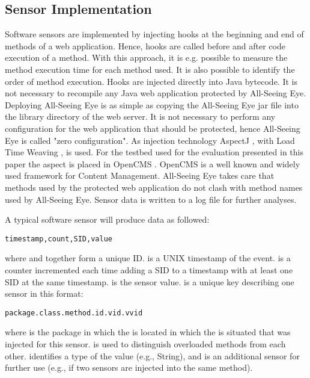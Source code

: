 \documentclass[conference]{IEEEtran}
\begin{document}
\subsection{Sensor Implementation}
Software sensors are implemented by injecting hooks at the beginning and end of methods of a web application. Hence, hooks are called before and after code execution of a method. With this approach, it is e.g. possible to measure the method execution time for each method used. It is also possible to identify the order of method execution. Hooks are injected directly into Java bytecode. It is not necessary to recompile any Java web application protected by All-Seeing Eye. Deploying All-Seeing Eye is as simple as copying the All-Seeing Eye jar file into the library directory of the web server. It is not necessary to perform any configuration for the web application that should be protected, hence All-Seeing Eye is called "zero configuration". As injection technology AspectJ \cite{aspectj_2013}, with Load Time Weaving \cite{weaving_2013}, is used. 
For the testbed used for the evaluation presented in this paper the aspect is placed in OpenCMS \cite{opencms_2013}. OpenCMS is a well known and widely used framework for Content Management.
All-Seeing Eye takes care that methods used by the protected web application do not clash with method names used by All-Seeing Eye. Sensor data is written to a log file for further analyses.

A typical software sensor will produce data as followed:

\begin{lstlisting}
timestamp,count,SID,value
\end{lstlisting}

where  and  together form a unique ID.  is a UNIX timestamp of the event.  is a counter incremented each time adding a SID to a timestamp with at least one SID at the same timestamp.  is the sensor value.  is a unique key describing one sensor in this format:

\begin{lstlisting}
package.class.method.id.vid.vvid
\end{lstlisting}

where  is the package in which the  is located in which the  is situated that was injected for this sensor.  is used to distinguish overloaded methods from each other.  identifies a type of the value (e.g., String), and  is an additional sensor for further use (e.g., if two sensors are injected into the same method).
\end{document}
